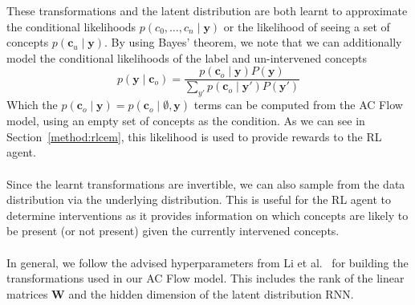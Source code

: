 These transformations and the latent distribution are both learnt to
approximate the conditional likelihoods $p(c_0, \ldots, c_n \mid \mathbf{y})$
or the likelihood of seeing a set of concepts $p(\mathbf{c}_u \mid \mathbf{y})$.
By using Bayes' theorem, we note that
we can additionally model the conditional likelihoods of the label and un-intervened
concepts
\begin{equation}\label{equation:bayes}
p(\mathbf{y} \mid \mathbf{c}_o ) = \frac{
p( \mathbf{c}_o \mid \mathbf{y}) P(\mathbf{y})}
{\sum_{y'} p( \mathbf{c}_o \mid \mathbf{y}')P(\mathbf{y}')}
\end{equation}
Which the $p(\mathbf{c}_o \mid \mathbf{y})= p(\mathbf{c}_o \mid \emptyset, \mathbf{y})$ terms can be computed from the AC Flow model,
using an empty set of concepts as the condition.
As we can see in Section~\ref{method:rlcem}, this likelihood is used to 
provide rewards to the RL agent. \\ \\
Since the learnt transformations are invertible,
we can also sample from the data distribution
via the underlying distribution.
This is useful for the RL agent to
determine interventions as
it provides information on which concepts are likely to be present 
(or not present) given the currently intervened
concepts. \\ \\
In general, we follow the advised hyperparameters from Li et al.~\cite{acflow}
for building the transformations used in our AC Flow model. This includes the rank of the linear
matrices $\mathbf{W}$ and the hidden dimension of the latent distribution RNN. 
